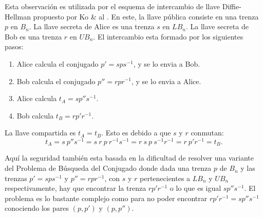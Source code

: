 \documentclass[12pt]{book}
\theoremstyle{definition}
\begin{document}
Esta observación es utilizada por el esquema de intercambio de llave Diffie-Hellman propuesto por Ko \& al \cite{Ko}. En este, la llave pública consiste en una trenza $p$ en $B_n$. La llave secreta de Alice es una trenza $s$ en $LB_n$. La llave secreta de Bob es una trenza $r$ en $UB_n$. El intercambio esta formado por los siguientes pasos:

\begin{enumerate}
\item Alice calcula el conjugado $p'=sps^{-1}$, y se lo envia a Bob.
\item Bob calcula el conjugado $p''=rpr^{-1}$, y se lo envia a Alice.
\item Alice calcula $t_A = sp''s^{-1}$.
\item Bob calcula $t_B = rp'r^{-1}$. 
\end{enumerate}

La llave compartida es $t_A = t_B$. Esto es debido a que $s$ y $r$ conmutan:
$$t_A=s\ p''s^{-1}=s\ r\ p\ r^{-1}s^{-1} = r\ s\ p\ s^{-1}r^{-1} = r\ p'r^{-1}=t_B.$$

Aquí la seguridad también esta basada en la dificultad de resolver una variante del Problema de Búsqueda del Conjugado donde dada una trenza $p$ de $B_n$ y las trenzas $p'=sps^{-1}$ y $p''=rpr^{-1}$, con $s$ y $r$ pertenecientes a $LB_n$ y $UB_n$ respectivamente, hay que encontrar la trenza $rp'r^{-1}$ o lo que es igual $sp''s^{-1}$. El problema es lo bastante complejo como para no poder encontrar $rp'r^{-1}=sp''s^{-1}$ conociendo los pares $(p,p')$ y $(p,p'')$.
\end{document}
